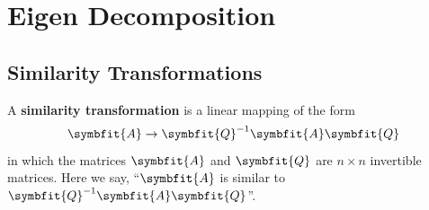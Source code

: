 \documentclass{article}
\begin{document}
\section{Eigen Decomposition}
	\subsection{Similarity Transformations}
	\begin{definition}
		A \textbf{similarity transformation} is a linear mapping of the form
		\begin{equation*}
			\symbfit{A}\rightarrow \symbfit{Q}^{-1}\symbfit{A}\symbfit{Q}
		\end{equation*}
		in which the matrices $\symbfit{A}$ and $\symbfit{Q}$ are $n \times n$ invertible matrices. Here we say, ``$\symbfit{A}$ is similar to $\symbfit{Q}^{-1}\symbfit{A}\symbfit{Q}$''.
	\end{definition}
\end{document}
